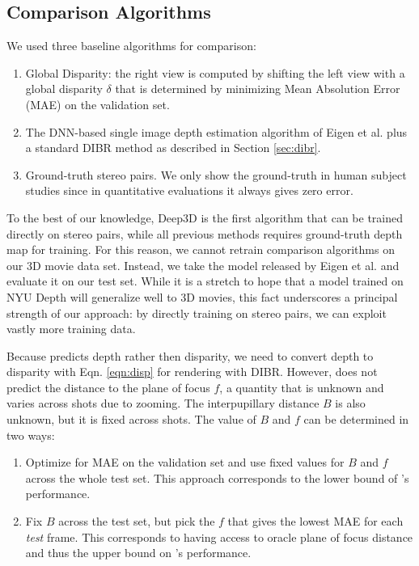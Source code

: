 \documentclass[runningheads]{llncs}
\begin{document}
\subsection{Comparison Algorithms}
We used three baseline algorithms for comparison:
\begin{enumerate}
\item Global Disparity: the right view is computed by shifting the left view with a global disparity $\delta$ that is determined by minimizing Mean Absolution Error (MAE) on the validation set.
\item The DNN-based single image depth estimation algorithm of Eigen et al. \cite{eigen2014depth} plus a standard DIBR method as described in Section \ref{sec:dibr}.
\item Ground-truth stereo pairs. We only show the ground-truth in human subject studies since in quantitative evaluations it always gives zero error.
\end{enumerate}

To the best of our knowledge, Deep3D is the first algorithm that can be trained directly on stereo pairs,
while all previous methods requires ground-truth depth map for training.
For this reason, we cannot retrain comparison algorithms on our 3D movie data set.
Instead, we take the model released by Eigen et al. \cite{eigen2014depth} and evaluate it on our test set.
While it is a stretch to hope that a model trained on NYU Depth will generalize well to 3D movies, this fact underscores a principal strength of our approach: by directly training on stereo pairs, we can exploit vastly more training data.

Because \cite{eigen2014depth} predicts depth rather then disparity, we need to convert depth to disparity with Eqn. \ref{eqn:disp} for rendering with DIBR.
However, \cite{eigen2014depth} does not predict the distance to the plane of focus $f$, a quantity that is unknown and varies across shots due to zooming.
The interpupillary distance $B$ is also unknown, but it is fixed across shots.
The value of $B$ and $f$ can be determined in two ways:
\begin{enumerate}
\item Optimize for MAE on the validation set and use fixed values for $B$ and $f$ across the whole test set.
This approach corresponds to the lower bound of \cite{eigen2014depth}'s performance.
\item Fix $B$ across the test set, but pick the $f$ that gives the lowest MAE for each \emph{test} frame.
This corresponds to having access to oracle plane of focus distance and thus the upper bound on \cite{eigen2014depth}'s performance.
\end{enumerate}
\end{document}
